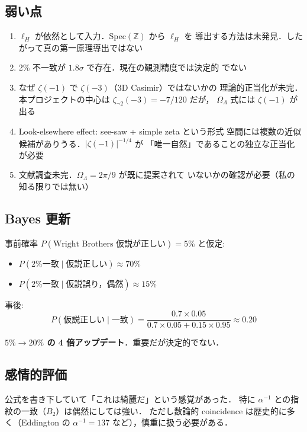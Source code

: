 \documentclass[11pt,a4paper]{article}
\begin{document}
\subsection{弱い点}

\begin{enumerate}
\item $\ell_H$ が依然として入力．Spec$(\mathbb{Z})$ から $\ell_H$ を
導出する方法は未発見．したがって真の第一原理導出ではない
\item 2\% 不一致が $1.8\sigma$ で存在．現在の観測精度では決定的
でない
\item なぜ $\zeta(-1)$ で $\zeta(-3)$（3D Casimir）ではないかの
理論的正当化が未完．本プロジェクトの中心は $\zeta_{\neg 2}(-3) = -7/120$ だが，
$\Omega_\Lambda$ 式には $\zeta(-1)$ が出る
\item Look-elsewhere effect: see-saw + simple zeta という形式
空間には複数の近似候補がありうる．$|\zeta(-1)|^{-1/4}$ が
「唯一自然」であることの独立な正当化が必要
\item 文献調査未完．$\Omega_\Lambda = 2\pi/9$ が既に提案されて
いないかの確認が必要（私の知る限りでは無い）
\end{enumerate}

\subsection{Bayes 更新}

事前確率 $P(\text{Wright Brothers 仮説が正しい}) = 5\%$ と仮定:
\begin{itemize}
\item $P(\text{2\% 一致}\mid\text{仮説正しい}) \approx 70\%$
\item $P(\text{2\% 一致}\mid\text{仮説誤り，偶然}) \approx 15\%$
\end{itemize}

事後:
\begin{equation}
P(\text{仮説正しい}\mid\text{一致}) = \frac{0.7\times 0.05}{0.7\times 0.05 + 0.15\times 0.95} \approx 0.20
\end{equation}

\textbf{$5\%\to 20\%$ の 4 倍アップデート}．重要だが決定的でない．

\subsection{感情的評価}

公式を書き下していて「これは綺麗だ」という感覚があった．
特に $\alpha^{-1}$ との指紋の一致（$B_2$）は偶然にしては強い．
ただし数論的 coincidence は歴史的に多く（Eddington の $\alpha^{-1}=137$
など），慎重に扱う必要がある．
\end{document}
